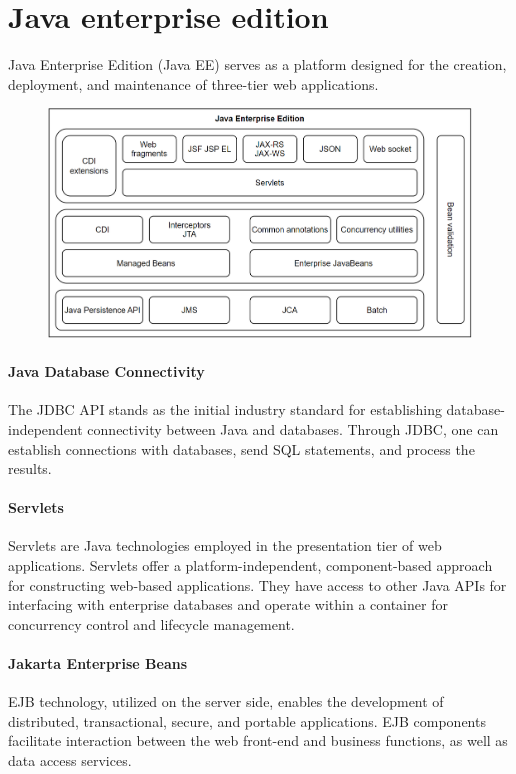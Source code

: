 \section{Java enterprise edition}

Java Enterprise Edition (Java EE) serves as a platform designed for the creation, deployment, and maintenance of three-tier web applications.
\begin{figure}[H]
    \centering
    \includegraphics[width=0.75\linewidth]{images/jee.png}
\end{figure}

\paragraph*{Java Database Connectivity}
The JDBC API stands as the initial industry standard for establishing database-independent connectivity between Java and databases. 
Through JDBC, one can establish connections with databases, send SQL statements, and process the results.
    
\paragraph*{Servlets}
Servlets are  Java technologies employed in the presentation tier of web applications. 
 Servlets offer a platform-independent, component-based approach for constructing web-based applications. 
They have access to other Java APIs for interfacing with enterprise databases and operate within a container for concurrency control and lifecycle management.
    
\paragraph*{Jakarta Enterprise Beans}
EJB technology, utilized on the server side, enables the development of distributed, transactional, secure, and portable applications. 
EJB components facilitate interaction between the web front-end and business functions, as well as data access services.
    
